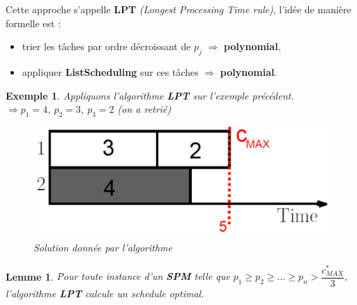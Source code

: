 \documentclass{article}
\newcommand{\titre}[1]{\textcolor{title}{#1}}
\newtheorem{exemple}{Exemple}[section]
\newtheorem{lemme}{Lemme}[section]
\begin{document}
\begin{sffamily}
Cette approche s'appelle \textbf{LPT} \textit{(Longest Processing Time rule)}, l'idée de manière formelle est :
\begin{itemize}
\item trier les tâches par ordre décroissant de $p_j$ $\Longrightarrow$ \textbf{polynomial},
\item appliquer \textbf{ListScheduling} sur ces tâches $\Longrightarrow$ \textbf{polynomial}.
\end{itemize}

\begin{exemple} Appliquons l'algorithme \textbf{LPT} sur l'exemple précédent.\\
$\Rightarrow p_1 = 4$, $p_2 = 3$, $p_3 = 2$ (on a retrié)
\begin{figure}[h!]
    \begin{center}
    \includegraphics[scale=0.3]{spm6.pdf}
    \caption{Solution donnée par l'algorithme}
    \end{center}
\end{figure}
\end{exemple}

\begin{lemme}
Pour toute instance d'un \textbf{\titre{SPM}} telle que $p_1\geq p_2\geq \ldots \geq p_n > \dfrac{c^*_{MAX}}{3}$, l'algorithme \textbf{LPT}
calcule un schedule optimal.
\end{lemme}

\newpage


\end{sffamily}
\end{document}
